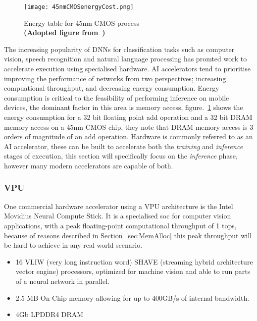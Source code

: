 \documentclass[../../D1.tex]{subfiles}
\begin{document}
 \begin{figure}[H]
    \begin{center}
        \texttt{[image: 45nmCMOSenergyCost.png]} 
    \end{center}
    
    \caption{Energy table for 45nm CMOS process\\ \textbf{(Adopted figure from~\autocite{hanLearningBothWeights2015})}}
    \label{fig:45nmCMOS}   
\end{figure}

 The increasing popularity of DNNs for classification tasks such as computer vision, speech recognition and natural language processing has promted work to accelerate execution using specialised hardware. 
 AI accelerators tend to prioritise improving the performance of networks from two perspectives; increasing compuational throughput, and decreasing energy consumption.
 Energy consumption is critical to the feasibility of performing inference on mobile devices, the dominant factor in this area is memory access, figure.~\ref{fig:45nmCMOS} shows the energy consumption for a 32 bit floating point add operation and a 32 bit DRAM memory access on a 45nm CMOS chip, they note that DRAM memory access is 3 orders of magnitude of an add operation.
 Hardware is commonly referred to as an AI accelerator, these can be built to accelerate both the \emph{training} and \emph{inference} stages of execution, this section will specifically focus on the \emph{inference} phase, however many modern accelerators are capable of both.

\subsubsection{VPU}
One commercial hardware accelerator using a VPU architecture is the Intel Movidius Neural Compute Stick.
It is a specialised \acrshort{soc} for computer vision applications, with a peak floating-point computational throughput of 1 \acrshort{tops}, because of reasons described in Section~\ref{sec:MemAlloc} this peak throughput will be hard to achieve in any real world scenario.

\begin{itemize}
    \item 16 VLIW (very long instruction word) SHAVE (streaming hybrid architecture vector engine) processors, optimized for machine vision and able to run parts of a neural network in parallel.
    \item 2.5 MB On-Chip memory allowing for up to 400GB/s of internal bandwidth.
    \item 4Gb LPDDR4 DRAM
\end{itemize}
\end{document}
